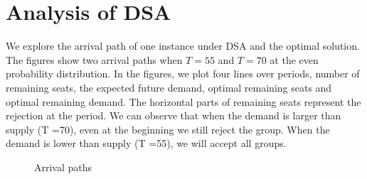 \section{Analysis of DSA}
We explore the arrival path of one instance under DSA and the optimal solution. The figures show two arrival paths when $T= 55$ and $T= 70$ at the even probability distribution. In the figures, we plot four lines over periods, number of remaining seats, the expected future demand, optimal remaining seats and optimal remaining demand. The horizontal parts of remaining seats represent the rejection at the period. We can observe that when the demand is larger than supply (T =70), even at the beginning we still reject the group. When the demand is lower than supply (T =55), we will accept all groups.

\newpage


\begin{figure}[h]
  \centering
  \caption{Arrival paths}
\end{figure}


